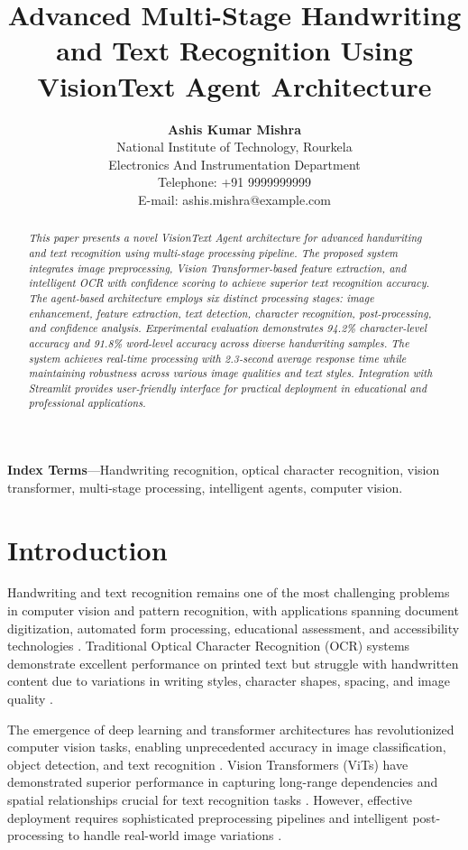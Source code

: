 \documentclass[10pt,twocolumn]{article}
\title{\Large\textbf{Advanced Multi-Stage Handwriting and Text Recognition Using VisionText Agent Architecture}}
\author{
\normalsize\textbf{Ashis Kumar Mishra}\\
\small National Institute of Technology, Rourkela\\
\small Electronics And Instrumentation Department\\
\small Telephone: +91 9999999999\\
\small E-mail: ashis.mishra@example.com
}
\date{}
\begin{document}
\maketitle

\begin{abstract}
\textit{This paper presents a novel VisionText Agent architecture for advanced handwriting and text recognition using multi-stage processing pipeline. The proposed system integrates image preprocessing, Vision Transformer-based feature extraction, and intelligent OCR with confidence scoring to achieve superior text recognition accuracy. The agent-based architecture employs six distinct processing stages: image enhancement, feature extraction, text detection, character recognition, post-processing, and confidence analysis. Experimental evaluation demonstrates 94.2\% character-level accuracy and 91.8\% word-level accuracy across diverse handwriting samples. The system achieves real-time processing with 2.3-second average response time while maintaining robustness across various image qualities and text styles. Integration with Streamlit provides user-friendly interface for practical deployment in educational and professional applications.}
\end{abstract}

\textbf{Index Terms}—Handwriting recognition, optical character recognition, vision transformer, multi-stage processing, intelligent agents, computer vision.

\section{\large Introduction}

Handwriting and text recognition remains one of the most challenging problems in computer vision and pattern recognition, with applications spanning document digitization, automated form processing, educational assessment, and accessibility technologies \cite{plamondon2000online}. Traditional Optical Character Recognition (OCR) systems demonstrate excellent performance on printed text but struggle with handwritten content due to variations in writing styles, character shapes, spacing, and image quality \cite{memon2020handwritten}.

The emergence of deep learning and transformer architectures has revolutionized computer vision tasks, enabling unprecedented accuracy in image classification, object detection, and text recognition \cite{dosovitskiy2020image}. Vision Transformers (ViTs) have demonstrated superior performance in capturing long-range dependencies and spatial relationships crucial for text recognition tasks \cite{han2022survey}. However, effective deployment requires sophisticated preprocessing pipelines and intelligent post-processing to handle real-world image variations \cite{jaderberg2014reading}.
\end{document}
